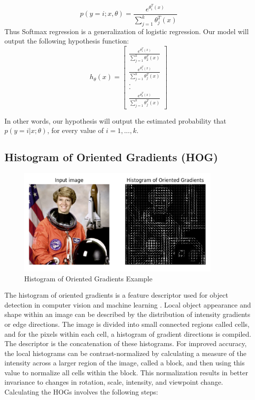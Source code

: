 \documentclass[twoside]{article}
\begin{document}
\[p(y=i;x,\theta) = \frac{e^{\theta_i^T(x)}}{\sum_{j=1}^k\theta_j^T(x)}\]
Thus Softmax regression is a generalization of logistic regression. Our model will output the following hypothesis function:
\[h_{\theta}(x) = \begin{bmatrix}\frac{e^{\theta_1^T(x)}}{\sum_{j=1}^k\theta_2^T(x)}\\\frac{e^{\theta_1^T(x)}}{\sum_{j=1}^k\theta_j^T(x)} \\
.\\
.\\
\frac{e^{\theta_k^T(x)}}{\sum_{j=1}^k\theta_j^T(x)} \end{bmatrix}\]

In other words, our hypothesis will output the estimated probability that $p(y = i|x; θ)$, for every value of $i = 1, . . . , k$.



\subsection{Histogram of Oriented Gradients (HOG)}
\begin{figure}[!ht]%
    \centering
    \includegraphics[width=10cm]{hog_example.png}
    \caption{Histogram of Oriented Gradients Example}
    \label{fig:hog_example}%
\end{figure}

The histogram of oriented gradients is a feature descriptor used for object detection in computer vision and machine learning \cite{wikipedia_2017}.
Local object appearance and shape within an image can be described by the distribution of intensity gradients or edge directions. The image is divided into small connected regions called cells, and for the pixels within each cell, a histogram of gradient directions is compiled. The descriptor is the concatenation of these histograms. For improved accuracy, the local histograms can be contrast-normalized by calculating a measure of the intensity across a larger region of the image, called a block, and then using this value to normalize all cells within the block. This normalization results in better invariance to changes in rotation, scale, intensity, and viewpoint change.
Calculating the HOGs involves the following steps: \\
\end{document}
